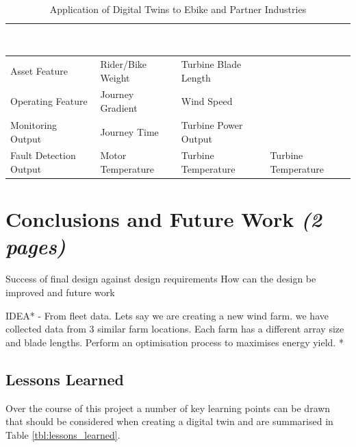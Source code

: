 \documentclass[a4paper, 10pt]{article}
\numberwithin{equation}{section}
\begin{document}
\begin{table}[H]
\centering
    \caption{Application of Digital Twins to Ebike and Partner Industries}
    \label{tbl:GP_application}
    \begin{tabular}{|l|l|l|l|}
        \hline
        \cellcolor{gray!120}\textcolor{white}{\textbf{Model Parameter}} & \cellcolor{gray!120}\textcolor{white}{\textbf{Ebike}} & \cellcolor{gray!120}\textcolor{white}{\textbf{DNV-GL}} & 
        \cellcolor{gray!120}\textcolor{white}{\textbf{Rolls Royce}} \\ \hline
        \hline
        Asset Feature & Rider/Bike Weight & Turbine Blade Length & \\
        Operating Feature & Journey Gradient  & Wind Speed & \\
        Monitoring Output & Journey Time & Turbine Power Output & \\
        Fault Detection Output & Motor Temperature & Turbine Temperature  & Turbine Temperature \\
        \hline
    \end{tabular}
\end{table}

\newpage
\section{Conclusions and Future Work \textit{(2 pages)}}
\label{sec:Conclusions_Future_Work}
Success of final design against design requirements
How can the design be improved and future work

IDEA* - From fleet data. Lets say we are creating a new wind farm. we have collected data from 3 similar farm locations. Each farm has a different array size and blade lengths. Perform an optimisation process to maximises energy yield. *

\subsection{Lessons Learned}

Over the course of this project a number of key learning points can be drawn that should be considered when creating a digital twin and are summarised in Table \ref{tbl:lessons_learned}. 
\end{document}

